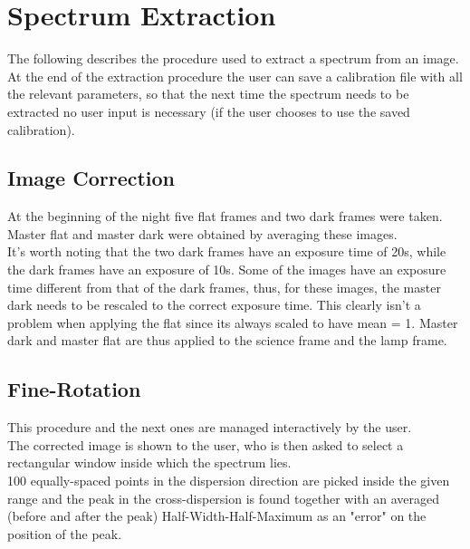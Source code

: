 \documentclass[a4paper]{article}
\begin{document}
	\section{Spectrum Extraction}
	\begin{multicols}{2}
		The following describes the procedure used to extract a spectrum from an image.\\
		At the end of the extraction procedure the user can save a calibration file with all the relevant parameters, so that the next time the spectrum needs to be extracted no user input is necessary (if the user chooses to use the saved calibration).
		
		\subsection{Image Correction}
			At the beginning of the night five flat frames and two dark frames were taken. Master flat and master dark were obtained by averaging these images.\\
			It's worth noting that the two dark frames have an exposure time of 20s, while the dark frames have an exposure of 10s. Some of the images have an exposure time different from that of the dark frames, thus, for these images, the master dark needs to be rescaled to the correct exposure time. This clearly isn't a problem when applying the flat since its always scaled to have mean = 1.
			Master dark and master flat are thus applied to the science frame and the lamp frame.\\
		
		\subsection{Fine-Rotation}
			This procedure and the next ones are managed interactively by the user.\\
			The corrected image is shown to the user, who is then asked to select a rectangular window inside which the spectrum lies.\\
			100 equally-spaced points in the dispersion direction are picked inside the given range and the peak in the cross-dispersion is found together with an averaged (before and after the peak) Half-Width-Half-Maximum as an "error" on the position of the peak.
			

\end{multicols}
\end{document}
